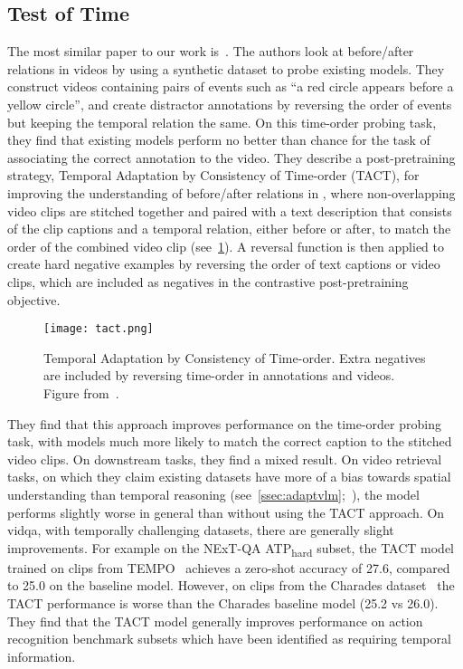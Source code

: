 \subsection{Test of Time}
\label{ssec:testoftime}
The most similar paper to our work is~\cite{bagad2023testoftime}. The authors
look at before/after relations in videos by using a synthetic dataset to
probe existing models. They construct videos containing pairs of events such
as ``a red circle appears before a yellow circle'', and create distractor
annotations by reversing the order of events but keeping the temporal relation
the same. On this time-order probing task, they find that existing models
perform no better than chance for the task of associating the correct
annotation to the video. They describe a post-pretraining strategy, Temporal
Adaptation by Consistency of Time-order (TACT), for improving the understanding
of before/after relations in , where non-overlapping video
clips are stitched together and paired with a text description that consists of
the clip captions and a temporal relation, either before or after, to match the
order of the combined video clip (see~\cref{fig:tact}). A reversal function is
then applied to create hard negative examples by reversing the order of text
captions or video clips, which are included as negatives in the contrastive
post-pretraining objective.

\begin{figure}[t]
	\centering
	\texttt{[image: tact.png]}
	\caption{Temporal Adaptation by Consistency of Time-order. Extra negatives
	are included by reversing time-order in annotations and videos. Figure
	from~\citet{bagad2023testoftime}.}
	\label{fig:tact}
\end{figure}

They find that this approach improves performance on the time-order probing
task, with models much more likely to match the correct caption to the stitched
video clips. On downstream tasks, they find a mixed result. On video retrieval
tasks, on which they claim existing datasets have more of a bias towards
spatial understanding than temporal reasoning
(see~\cref{ssec:adaptvlm};~\citet{buch2022revisiting,lei2023revealing,luo2022clip4clip}),
the model performs slightly worse in general than without using the TACT
approach. On \acrlong{vidqa}, with temporally challenging datasets, there are
generally slight improvements. For example on the NExT-QA
ATP\textsubscript{hard} subset, the TACT model trained on clips from
TEMPO~\citep{hendricks2018tempo} achieves a zero-shot accuracy of 27.6,
compared to 25.0 on the baseline model.  However, on clips from the Charades
dataset~\citep{sigurdsson2016charades} the TACT performance is worse than the
Charades baseline model (25.2 vs 26.0). They find that the TACT model generally
improves performance on action recognition benchmark subsets which have been
identified as requiring temporal information. 

